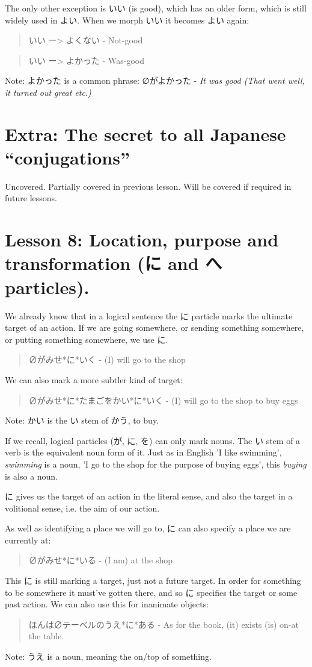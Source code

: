 \documentclass[11pt]{article}
\begin{document}
The only other exception is いい (is good), which has an older form, which is still widely used in よい. When we morph いい it becomes よい again:
\begin{quote}
いい ー> よくない - Not-good
\end{quote}
\begin{quote}
いい ー> よかった - Was-good
\end{quote}

Note: よかった is a common phrase: ∅がよかった - \emph{It was good (That went well, it turned out great etc.)}
\section{Extra: The secret to all Japanese ``conjugations''}
\label{sec:org4b68ab8}
Uncovered. Partially covered in previous lesson. Will be covered if required in future lessons.
\section{Lesson 8: Location, purpose and transformation (に and へ particles).}
\label{sec:orga1ccd9e}
We already know that in a logical sentence the に particle marks the ultimate target of an action. If we are going somewhere, or sending something somewhere, or putting something somewhere, we use に.
\begin{quote}
∅がみせ*に*いく - (I) will go to the shop
\end{quote}
We can also mark a more subtler kind of target:
\begin{quote}
∅がみせ*に*たまごをかい*に*いく - (I) will go to the shop to buy eggs
\end{quote}
Note: かい is the い stem of かう, to buy.

If we recall, logical particles (が, に, を) can only mark nouns. The い stem of a verb is the equivalent noun form of it. Just as in English 'I like swimming', \emph{swimming} is a noun, 'I go to the shop for the purpose of buying eggs', this \emph{buying} is also a noun.

に gives us the target of an action in the literal sense, and also the target in a volitional sense, i.e. the aim of our action.

As well as identifying a place we will go to, に can also specify a place we are currently at:
\begin{quote}
∅がみせ*に*いる - (I am) at the shop
\end{quote}
This に is still marking a target, just not a future target. In order for something to be somewhere it must've gotten there, and so に specifies the target or some past action. We can also use this for inanimate objects:
\begin{quote}
ほんは∅テーベルのうえ*に*ある - As for the book, (it) exists (is) on-at the table.
\end{quote}
Note: うえ is a noun, meaning the on/top of something.
\end{document}
